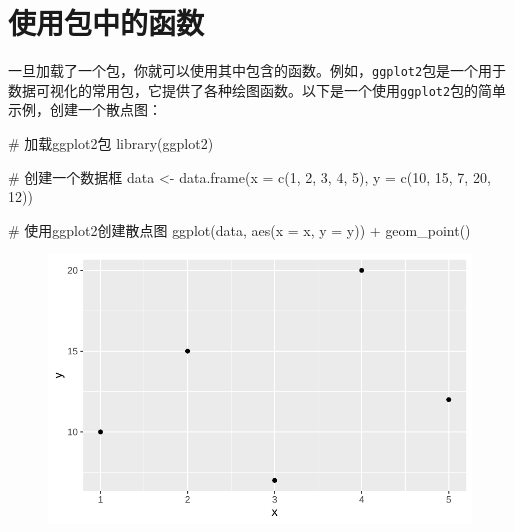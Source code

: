 \documentclass[
  letterpaper,
  DIV=11,
  numbers=noendperiod]{scrreprt}
\newenvironment{Shaded}{\begin{snugshade}}{\end{snugshade}}
\newcommand{\AttributeTok}[1]{\textcolor[rgb]{0.40,0.45,0.13}{#1}}
\newcommand{\CommentTok}[1]{\textcolor[rgb]{0.37,0.37,0.37}{#1}}
\newcommand{\DecValTok}[1]{\textcolor[rgb]{0.68,0.00,0.00}{#1}}
\newcommand{\FunctionTok}[1]{\textcolor[rgb]{0.28,0.35,0.67}{#1}}
\newcommand{\NormalTok}[1]{\textcolor[rgb]{0.00,0.23,0.31}{#1}}
\newcommand{\OtherTok}[1]{\textcolor[rgb]{0.00,0.23,0.31}{#1}}
\newcommand{\SpecialCharTok}[1]{\textcolor[rgb]{0.37,0.37,0.37}{#1}}
\begin{document}
\hypertarget{ux4f7fux7528ux5305ux4e2dux7684ux51fdux6570}{%
\section{使用包中的函数}\label{ux4f7fux7528ux5305ux4e2dux7684ux51fdux6570}}

一旦加载了一个包，你就可以使用其中包含的函数。例如，\texttt{ggplot2}包是一个用于数据可视化的常用包，它提供了各种绘图函数。以下是一个使用\texttt{ggplot2}包的简单示例，创建一个散点图：

\begin{Shaded}
\begin{Highlighting}[]
\CommentTok{\# 加载ggplot2包}
\FunctionTok{library}\NormalTok{(ggplot2)}

\CommentTok{\# 创建一个数据框}
\NormalTok{data }\OtherTok{\textless{}{-}} \FunctionTok{data.frame}\NormalTok{(}\AttributeTok{x =} \FunctionTok{c}\NormalTok{(}\DecValTok{1}\NormalTok{, }\DecValTok{2}\NormalTok{, }\DecValTok{3}\NormalTok{, }\DecValTok{4}\NormalTok{, }\DecValTok{5}\NormalTok{), }\AttributeTok{y =} \FunctionTok{c}\NormalTok{(}\DecValTok{10}\NormalTok{, }\DecValTok{15}\NormalTok{, }\DecValTok{7}\NormalTok{, }\DecValTok{20}\NormalTok{, }\DecValTok{12}\NormalTok{))}

\CommentTok{\# 使用ggplot2创建散点图}
\FunctionTok{ggplot}\NormalTok{(data, }\FunctionTok{aes}\NormalTok{(}\AttributeTok{x =}\NormalTok{ x, }\AttributeTok{y =}\NormalTok{ y)) }\SpecialCharTok{+}
  \FunctionTok{geom\_point}\NormalTok{()}
\end{Highlighting}
\end{Shaded}

\begin{figure}[H]

{\centering \includegraphics{chapter/base_package_files/figure-pdf/unnamed-chunk-4-1.pdf}

}

\end{figure}
\end{document}
